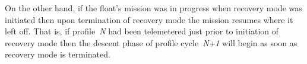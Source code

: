 On the other hand, if the float's mission was in progress when recovery mode
was initiated then upon termination of recovery mode the mission resumes
where it left off.  That is, if profile~\emph{N\/} had been telemetered just
prior to initiation of recovery mode then the descent phase of profile
cycle~\emph{N+1\/} will begin as soon as recovery mode is terminated.

